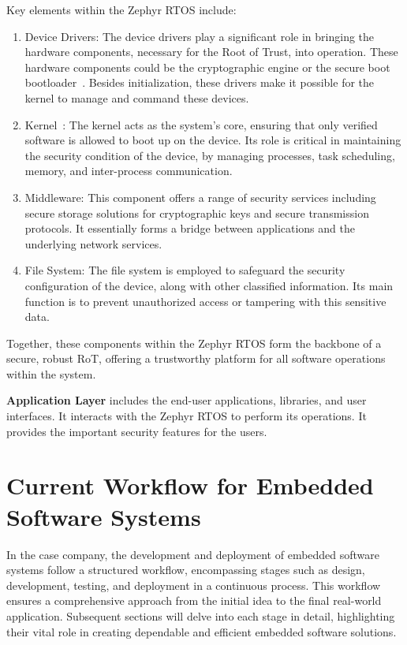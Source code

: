 Key elements within the Zephyr RTOS include:
\begin{enumerate}
\item Device Drivers: The device drivers play a significant role in bringing the hardware
components, necessary for the Root of Trust, into operation. These hardware components
could be the cryptographic engine or the secure boot bootloader~\cite{Bootload40:online}. Besides initialization,
these drivers make it possible for the kernel to manage and command these devices.
\item Kernel~\cite{Kernelin72:online}: The kernel acts as the system's core, ensuring that only verified software is allowed
to boot up on the device. Its role is critical in maintaining the security condition
of the device, by managing processes, task scheduling, memory, and inter-process communication.
\item Middleware: This component offers a range of security services including secure storage
solutions for cryptographic keys and secure transmission protocols. It essentially forms a bridge
between applications and the underlying network services.
\item File System: The file system is employed to safeguard the security configuration
of the device, along with other classified information. Its main function is to prevent
unauthorized access or tampering with this sensitive data.
\end{enumerate}
Together, these components within the Zephyr RTOS form the backbone of a secure, robust RoT,
offering a trustworthy platform for all software operations within the system.

\textbf{Application Layer} includes the end-user applications, libraries, and
user interfaces. It interacts with the Zephyr RTOS to perform its operations. It provides the
important security features for the users.

\section{Current Workflow for Embedded Software Systems}
In the case company, the development and deployment of embedded software systems
follow a structured workflow, encompassing stages such as design, development,
testing, and deployment in a continuous process. This workflow ensures a comprehensive approach from the
initial idea to the final real-world application. Subsequent sections will delve
into each stage in detail, highlighting their vital role in creating dependable
and efficient embedded software solutions.

